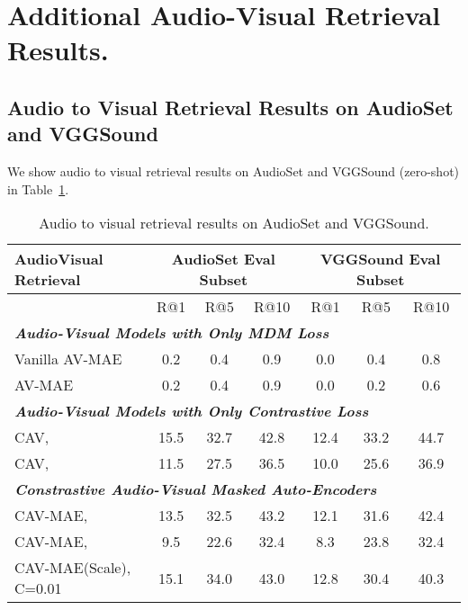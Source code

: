 \documentclass{article} \usepackage{iclr2023_conference,times}
\begin{document}
\section{Additional Audio-Visual Retrieval Results.}
\label{sec:add_re}

\subsection{Audio to Visual Retrieval Results on AudioSet and VGGSound}

We show audio to visual retrieval results on AudioSet and VGGSound (zero-shot) in Table~\ref{tab:aretrieval}.

\begin{table}[h]
\centering
\caption{Audio to visual retrieval results on AudioSet and VGGSound.}\label{tab:aretrieval}
\begin{tabular}{@{}lcccccc@{}}
\toprule
AudioVisual Retrieval & \multicolumn{3}{c}{AudioSet Eval Subset} & \multicolumn{3}{c}{VGGSound Eval Subset} \\ \midrule
                       & R@1          & R@5         & R@10        & R@1          & R@5         & R@10        \\ \cmidrule(l){2-7} 
\multicolumn{7}{l}{\textit{\textbf{Audio-Visual Models with Only MDM Loss}}}                                 \\
Vanilla AV-MAE         & 0.2          & 0.4         & 0.9         & 0.0          & 0.4         & 0.8         \\
AV-MAE                 & 0.2          & 0.4         & 0.9         & 0.0          & 0.2         & 0.6         \\
\multicolumn{7}{l}{\textit{\textbf{Audio-Visual Models with Only Contrastive Loss}}}                         \\
CAV,              & 15.5         & 32.7        & 42.8        & 12.4         & 33.2        & 44.7        \\
CAV,             & 11.5         & 27.5        & 36.5        & 10.0         & 25.6        & 36.9        \\
\multicolumn{7}{l}{\textit{\textbf{Constrastive Audio-Visual Masked Auto-Encoders}}}                         \\
CAV-MAE,          & 13.5         & 32.5        & 43.2        & 12.1         & 31.6        & 42.4        \\
CAV-MAE,         & 9.5          & 22.6        & 32.4        & 8.3          & 23.8        & 32.4        \\ \midrule
CAV-MAE(Scale), C=0.01 & 15.1         & 34.0        & 43.0        & 12.8         & 30.4        & 40.3        \\ \bottomrule
\end{tabular}
\end{table}
\end{document}

